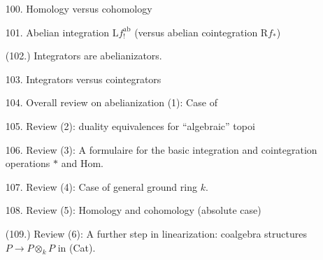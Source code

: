 \documentclass[11pt,a4paper]{article}
\begin{document}

\begin{itemize}
  \item[100.] Homology versus cohomology
  \item[101.] Abelian integration $\mathrm{L}f_{!}^{\mathrm{ab}}$ (versus abelian cointegration $\mathrm{R}f_{*}$)
  \item[(102.)] Integrators are abelianizators.
  \item[103.] Integrators versus cointegrators
  \item[104.] Overall review on abelianization (1): Case of 
  \item[105.] Review (2): duality equivalences for ``algebraic'' topoi 
  \item[106.] Review (3): A formulaire for the basic integration and cointegration operations $*$ and $\mathrm{Hom}$.
  \item[107.] Review (4): Case of general ground ring $k$.
  \item[108.] Review (5): Homology and cohomology (absolute case)
  \item[(109.)] Review (6): A further step in linearization: coalgebra structures $P\to P\otimes_{k}P$ in (Cat).
\end{itemize}
\end{document}
